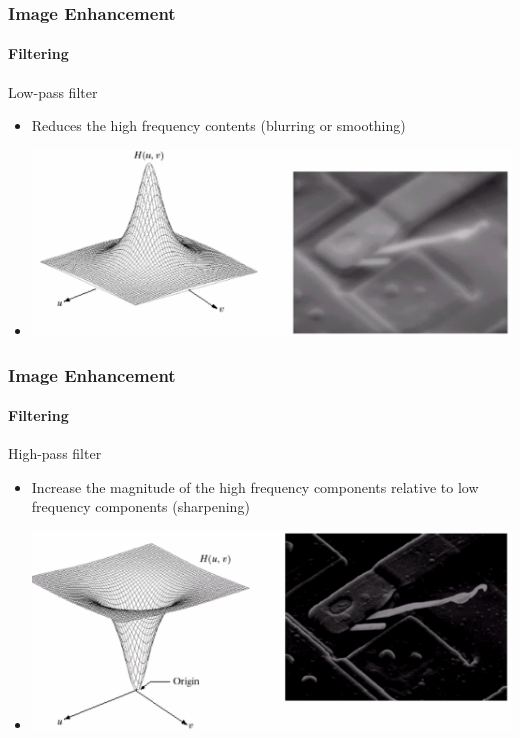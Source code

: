 \documentclass{beamer}
\begin{document}
\begin{frame}
\frametitle{Image Enhancement}
\framesubtitle{Filtering}
\begin{block}{Low-pass filter}
\begin{itemize}
	\item Reduces the high frequency contents (blurring or smoothing)
	\item []
	\begin{center}
	\includegraphics[scale=0.24]{images/F1_ex_LP.png}
	\end{center}
\end{itemize}
\end{block}

\end{frame}
\begin{frame}
\frametitle{Image Enhancement}
\framesubtitle{Filtering}
\begin{block}{High-pass filter}
\begin{itemize}
	\item Increase the magnitude of the high frequency components relative to low frequency components (sharpening)
	\item []
	\begin{center}
	\includegraphics[scale=0.24]{images/F1_ex_HP.png}
	\end{center}
\end{itemize}
\end{block}
\end{frame}
\end{document}
